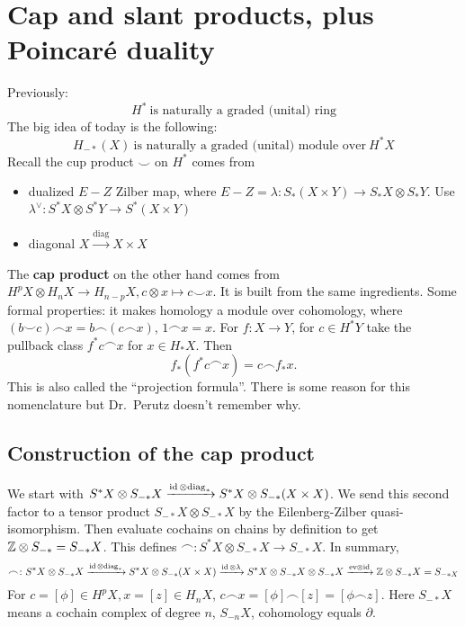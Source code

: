 \section{Cap and slant products, plus Poincar\'e duality}  
Previously: \[
    \boxed{H^* \ \text{is naturally a graded (unital) ring} } 
\] The big idea of today is the following: \[
\boxed{H_{- *}\left( X \right) \ \text{is naturally a graded (unital) module over} \ H^* X} 
\] Recall the cup product $\smile$ on  $H^*$ comes from 
\begin{itemize}
\setlength\itemsep{-.2em}
    \item dualized $E-Z$ Zilber map, where $E-Z = \lambda \colon S_*(X \times Y) \to S_*X \otimes S_*Y$. Use $\lambda^{\vee} \colon S^*X \otimes S^* Y \to S^*(X \times Y)$
    \item diagonal $X \xrightarrow{\mathrm{diag}} X \times X$
\end{itemize}
The \textbf{cap product} on the other hand comes from $H^p X \otimes H_nX \to H_{n-p}X, c\otimes x \mapsto  c \smile x$. It is built from the same ingredients. Some formal properties: it makes homology a module over cohomology, where $(b \smile c) \frown x= b \frown (c \frown x)$, $1 \frown x = x$. For $f \colon X \to Y$, for $c \in H^*Y$ take the pullback class $f^* c \frown x$ for $ x \in H_*X$. Then  \[
    f_*(f^* c \frown x) = c \frown f_*x.
\] This is also called the ``projection formula''. There is some reason for this nomenclature but Dr.\ Perutz doesn't remember why.

\subsection*{Construction of the cap product}
We start with $S^* X \otimes S_{-*}X \xrightarrow{\operatorname{id} \otimes \mathrm{diag}_*} S^*X \otimes S_{-*}(X \times X)$. We send this second factor to a tensor product $S _{-*}X \otimes S_{-*}X$ by the Eilenberg-Zilber quasi-isomorphism. Then evaluate cochains on chains by definition to get $\mathbb{Z} \otimes S_{-*}=S _{-*}X$. This defines $\frown \colon S^*X \otimes S_{-*}X \to S _{-*}X$. In summary, \[
\frown \colon S^* X \otimes S_{-*}X \xrightarrow{\operatorname{id} \otimes \mathrm{diag}_*} S^*X \otimes S_{-*}(X \times X) \xrightarrow{\operatorname{id}\otimes \lambda} S ^*X\otimes S _{-*}X \otimes S_{-*}X\xrightarrow{\mathrm{ev}\otimes \operatorname{id}}  \mathbb{Z}\otimes S _{-*}X = S _{-*X}
\] For $c = [\phi] \in  H^p X, x=[z] \in H_n X$, $c \frown x = [\phi]\frown [z]=[\phi \frown z]$. Here $S_{-*}X$ means a cochain complex of degree $n$, $S _{-n}X$, cohomology equals $\partial $.


